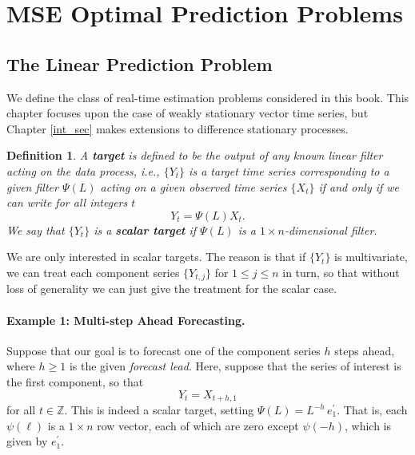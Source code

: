 \documentclass[a4paper]{book}
\def\ZZ{\mathbb Z}
\newtheorem{Definition}{Definition}
\begin{document}
\section{MSE Optimal Prediction Problems}

\subsection{The Linear Prediction Problem} We define the class of
real-time estimation problems considered in this book.  This chapter
 focuses upon the case of weakly stationary vector time series, but
 Chapter \ref{int_sec} makes extensions to difference stationary processes.

\begin{Definition} \rm
 A {\bf target} is defined to be the output of any known linear
 filter acting on the data process, i.e.,  $\{Y_t \}$ is a target
 time series corresponding to a given filter $\Psi (L)$ acting on a 
given observed time series
 $\{ X_t \}$ if and only if we can write for all integers $t$
\[
 Y_t = \Psi (L) X_t.
\] 
 We say that $\{ Y_t \}$ is a {\bf scalar target} if $\Psi (L)$ is a
 $1 \times n$-dimensional filter.
\end{Definition}

We are only interested in scalar targets.  The reason is that if $\{ Y_t \}$
 is multivariate, we can treat each component series $\{ Y_{t,j} \}$ for
 $1 \leq j \leq n$ in turn, so that without loss of generality we
 can just give the treatment for the scalar case. 

\paragraph{Example 1: Multi-step Ahead Forecasting.}  
  Suppose that our goal is to forecast one of the component series 
 $h$ steps ahead, where $h \geq 1$ is the given {\em forecast lead}.
  Here, suppose that the series of interest is the first component, so 
 that 
\[
  Y_t = X_{t+h,1}
\]
  for all $ t \in \ZZ$.  This is indeed a scalar target, setting
  $\Psi (L) = L^{-h} \, e_1^{\prime}$.  That is, each $\psi (\ell)$
 is a $1 \times n$ row vector, each of which are zero except $\psi (-h)$,
 which is given by $e_1^{\prime}$.
 
\end{document}
